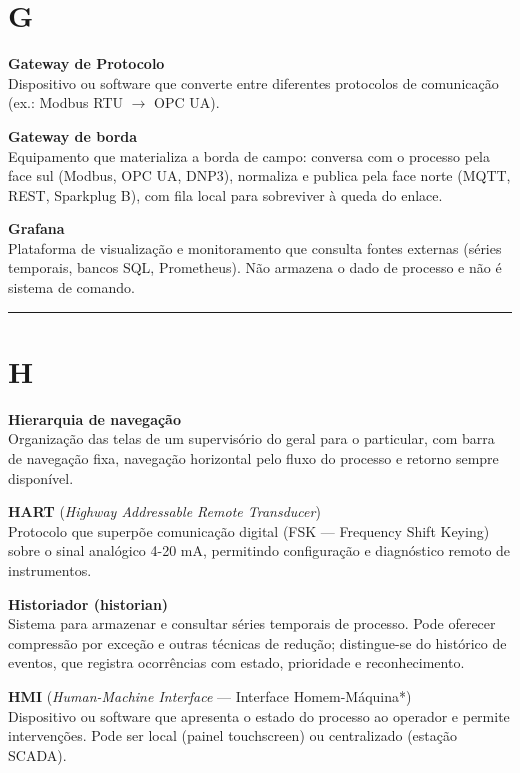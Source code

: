 \section{G}\label{g}

\textbf{Gateway de Protocolo}\\
Dispositivo ou software que converte entre diferentes protocolos de comunicação (ex.: Modbus RTU \ensuremath{\rightarrow} OPC UA).

\textbf{Gateway de borda}\\
Equipamento que materializa a borda de campo: conversa com o processo pela face sul (Modbus, OPC UA, DNP3), normaliza e publica pela face norte (MQTT, REST, Sparkplug B), com fila local para sobreviver à queda do enlace.

\textbf{Grafana}\\
Plataforma de visualização e monitoramento que consulta fontes externas (séries temporais, bancos SQL, Prometheus). Não armazena o dado de processo e não é sistema de comando.

\begin{center}\rule{0.5\linewidth}{0.5pt}\end{center}

\section{H}\label{h}

\textbf{Hierarquia de navegação}\\
Organização das telas de um supervisório do geral para o particular, com barra de navegação fixa, navegação horizontal pelo fluxo do processo e retorno sempre disponível.

\textbf{HART} (\emph{Highway Addressable Remote Transducer})\\
Protocolo que superpõe comunicação digital (FSK --- Frequency Shift Keying) sobre o sinal analógico 4-20 mA, permitindo configuração e diagnóstico remoto de instrumentos.

\textbf{Historiador (historian)}\\
Sistema para armazenar e consultar séries temporais de processo. Pode oferecer compressão por exceção e outras técnicas de redução; distingue-se do histórico de eventos, que registra ocorrências com estado, prioridade e reconhecimento.

\textbf{HMI} (\emph{Human-Machine Interface} --- Interface Homem-Máquina*)\\
Dispositivo ou software que apresenta o estado do processo ao operador e permite intervenções. Pode ser local (painel touchscreen) ou centralizado (estação SCADA).

